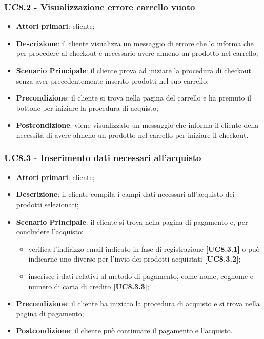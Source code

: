 \subsubsection{UC8.2 - Visualizzazione errore carrello vuoto}
\begin{itemize}
\item \textbf{Attori primari}: cliente;
\item \textbf{Descrizione}: il cliente visualizza un messaggio di errore che lo informa che per procedere al checkout è necessario avere almeno un prodotto nel carrello;
\item \textbf{Scenario Principale}: il cliente prova ad iniziare la procedura di checkout senza aver precedentemente inserito prodotti nel suo carrello;
\item \textbf{Precondizione}: il cliente si trova nella pagina del carrello e ha premuto il bottone  per iniziare la procedura di acquisto;
\item \textbf{Postcondizione}: viene visualizzato un messaggio che informa il cliente della necessità di avere almeno un prodotto nel carrello per iniziare il checkout.
\end{itemize}

\subsubsection{UC8.3 - Inserimento dati necessari all'acquisto}
\begin{itemize}
\item \textbf{Attori primari}: cliente;
\item \textbf{Descrizione}: il cliente compila i campi dati necessari all'acquisto dei prodotti selezionati;
\item \textbf{Scenario Principale}: il cliente si trova nella pagina di pagamento e, per concludere l'acquisto:
\begin{itemize}
	\item verifica l'indirizzo email indicato in fase di registrazione \textbf{[UC8.3.1]} o può indicarne uno diverso per l'invio dei prodotti acquistati \textbf{[UC8.3.2]};
	\item inserisce i dati relativi al metodo di pagamento, come nome, cognome e numero di carta di credito \textbf{[UC8.3.3]};
\end{itemize}
\item \textbf{Precondizione}: il cliente ha iniziato la procedura di acquisto e si trova nella pagina di pagamento;
\item \textbf{Postcondizione}: il cliente può continuare il pagamento e l'acquisto.
\end{itemize}

